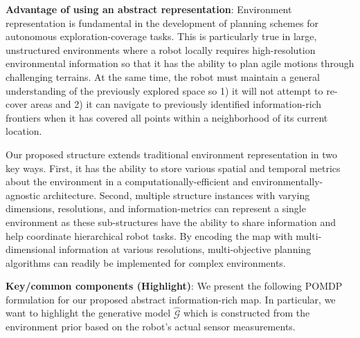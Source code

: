 \documentclass{article}
\newcommand{\ph}[1]{{\textbf{#1}:}} %
\begin{document}
\ph{Advantage of using an abstract representation} Environment representation is fundamental in the development of planning schemes for autonomous exploration-coverage tasks. This is particularly true in large, unstructured environments where a robot locally requires high-resolution environmental information so that it has the ability to plan agile motions through challenging terrains. At the same time, the robot must maintain a general understanding of the previously explored space so 1) it will not attempt to re-cover areas and 2) it can navigate to previously identified information-rich frontiers when it has covered all points within a neighborhood of its current location. 

Our proposed structure extends traditional environment representation in two key ways. First, it has the ability to store various spatial and temporal metrics about the environment in a computationally-efficient and environmentally-agnostic architecture. Second, multiple structure instances with varying dimensions, resolutions, and information-metrics can represent a single environment as these sub-structures have the ability to share information and help coordinate hierarchical robot tasks. By encoding the map with multi-dimensional information at various resolutions, multi-objective planning algorithms can readily be implemented for complex environments.  




\ph{Key/common components (Highlight)}
We present the following POMDP formulation for our proposed abstract information-rich map. In particular, we want to highlight the generative model $\hat{\mathcal{G}}$ which is constructed from the environment prior based on the robot's actual sensor measurements. 
\end{document}
